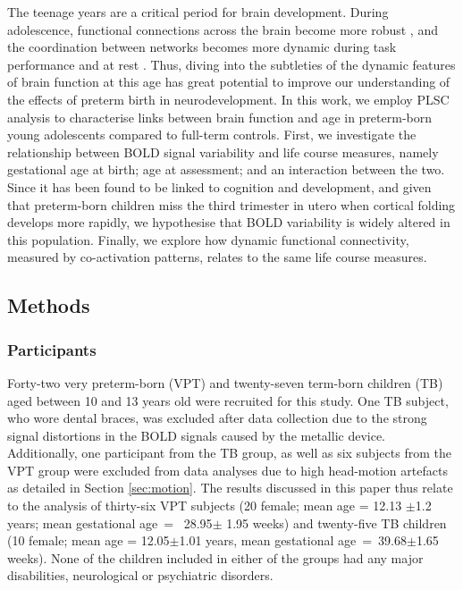   
     The teenage years are a critical period for brain development. During adolescence, functional connections across the brain become more robust \citep{Power2010}, and the coordination between networks becomes more dynamic during task performance \citep{Hutchison2015} and at rest \citep{Marusak2017, Faghiri2018}. Thus, diving into the subtleties of the dynamic features of brain function at this age has great potential to improve our understanding of the effects of preterm birth in neurodevelopment. In this work, we employ PLSC analysis to characterise links between brain function and age in preterm-born young adolescents compared to full-term controls. First, we investigate the relationship between BOLD signal variability and life course measures, namely gestational age at birth; age at assessment; and an interaction between the two. Since it has been found to be linked to cognition and development, and given that preterm-born children miss the third trimester in utero when cortical folding develops more rapidly, we hypothesise that BOLD variability is widely altered in this population. Finally, we explore how dynamic functional connectivity, measured by co-activation patterns, relates to the same life course measures. 




\subsection{Methods}

\subsubsection{Participants}
Forty-two very preterm-born (VPT) and twenty-seven term-born children (TB) aged between 10 and 13 years old were recruited for this study. One TB subject, who wore dental braces, was excluded after data collection due to the strong signal distortions in the BOLD signals caused by the metallic device. Additionally, one participant from the TB group, as well as six subjects from the VPT group were excluded from data analyses due to high head-motion artefacts as detailed in Section \ref{sec:motion}. The results discussed in this paper thus relate to the analysis of thirty-six VPT subjects (20 female; mean age = 12.13 $\pm$1.2 years; mean gestational age~=~ 28.95$\pm$ 1.95 weeks) and twenty-five TB children (10 female; mean age = 12.05$\pm$1.01 years, mean gestational age~=~39.68$\pm$1.65 weeks). None of the children included in either of the groups had any major disabilities, neurological or psychiatric disorders.    


